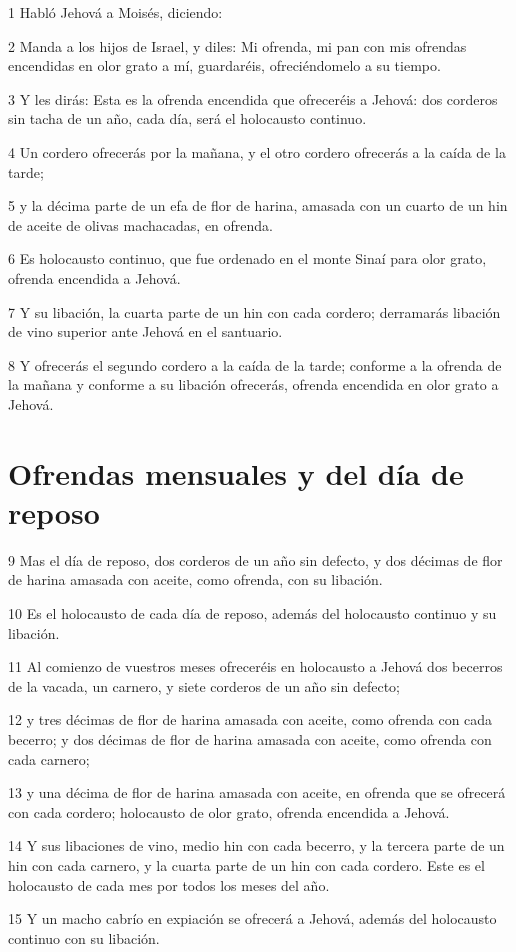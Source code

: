 \par 1 Habló Jehová a Moisés, diciendo: 
\par 2 Manda a los hijos de Israel, y diles: Mi ofrenda, mi pan con mis ofrendas encendidas en olor grato a mí, guardaréis, ofreciéndomelo a su tiempo.
\par 3 Y les dirás: Esta es la ofrenda encendida que ofreceréis a Jehová: dos corderos sin tacha de un año, cada día, será el holocausto continuo.
\par 4 Un cordero ofrecerás por la mañana, y el otro cordero ofrecerás a la caída de la tarde;
\par 5 y la décima parte de un efa   de flor de harina, amasada con un cuarto de un hin de aceite de olivas machacadas, en ofrenda.
\par 6 Es holocausto continuo, que fue ordenado en el monte Sinaí para olor grato, ofrenda encendida a Jehová.
\par 7 Y su libación, la cuarta parte de un hin   con cada cordero; derramarás libación de vino superior ante Jehová en el santuario.
\par 8 Y ofrecerás el segundo cordero a la caída de la tarde; conforme a la ofrenda de la mañana y conforme a su libación ofrecerás, ofrenda encendida en olor grato a Jehová.

\section*{Ofrendas mensuales y del día de reposo}

\par 9 Mas el día de reposo, dos corderos de un año sin defecto, y dos décimas de flor de harina amasada con aceite, como ofrenda, con su libación.
\par 10 Es el holocausto de cada día de reposo, además del holocausto continuo y su libación.
\par 11 Al comienzo de vuestros meses ofreceréis en holocausto a Jehová dos becerros de la vacada, un carnero, y siete corderos de un año sin defecto;
\par 12 y tres décimas de flor de harina amasada con aceite, como ofrenda con cada becerro; y dos décimas de flor de harina amasada con aceite, como ofrenda con cada carnero;
\par 13 y una décima de flor de harina amasada con aceite, en ofrenda que se ofrecerá con cada cordero; holocausto de olor grato, ofrenda encendida a Jehová.
\par 14 Y sus libaciones de vino, medio hin   con cada becerro, y la tercera parte de un hin con cada carnero, y la cuarta parte de un hin con cada cordero. Este es el holocausto de cada mes por todos los meses del año.
\par 15 Y un macho cabrío en expiación se ofrecerá a Jehová, además del holocausto continuo con su libación.

